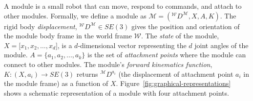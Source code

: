 \documentclass[graybox]{svmult}
\begin{document}
\begin{definition}[Module] A module is a small robot that can move, respond to commands,
and attach to other modules.  Formally, we define a  module  as
$\mathcal{M}=({^\mathcal{W}}D^{\mathcal{M}}, X, A,K)$.
The rigid body \textit{displacement}, ${^\mathcal{W}}D^{\mathcal{M}}\in SE(3)$ 
gives the position and orientation of the module body frame in the world  frame $\mathcal{W}$.
The \textit{state} of the module, \(X=\lbrack x_1, x_2, \ldots, x_d \rbrack\),
 is a \(d\)-dimensional vector representing the \(d\) joint angles of the module.
$A=\{a_1, a_2, ..., a_k\}$ is the set of \textit{attachment points} where the 
module can connect to other modules.
The  module's \textit{forward kinematics function}, \(K: (X, a_i) \rightarrow SE(3) \) 
returns \({^\mathcal{M}}D^{a_{i}}\) (the displacement of attachment point \(a_i\) 
in the module frame) as a function of \(X\).
%
Figure~\ref{fig:graphical-representations} shows a schematic representation of a module with  four attachment points.
\end{definition}
%
\end{document}
